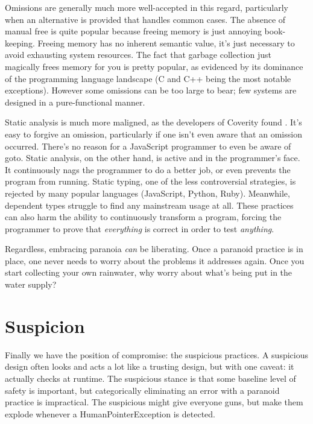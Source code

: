 Omissions are generally much more well-accepted in this regard, particularly
when an alternative is provided that handles common cases. The
absence of manual free is quite popular because freeing memory is just annoying
book-keeping. Freeing memory has no inherent semantic value, it's just necessary
to avoid exhausting system resources. The fact that garbage collection just
magically frees memory for you is pretty popular, as evidenced by its dominance
of the programming language landscape (C and C++ being the most notable exceptions).
However some omissions can be too large to bear; few systems are designed in
a pure-functional manner.

Static analysis is much more maligned, as the developers of Coverity found
\cite{bessey2010few}. It's easy to forgive an omission, particularly if one isn't
even aware that an omission occurred. There's no reason for a JavaScript programmer
to even be aware of goto.
Static analysis, on the other hand, is active and in the programmer's face.
It continuously nags the programmer to do a better job, or even prevents the
program from running. Static typing, one of the less controversial
strategies, is rejected by many popular languages (JavaScript, Python, Ruby).
Meanwhile, dependent types struggle to find any mainstream usage at all. These practices
can also harm the ability to continuously transform a program, forcing the
programmer to prove that \emph{everything} is correct in order to test \emph{anything}.

Regardless, embracing paranoia \emph{can} be liberating. Once a paranoid
practice is in place, one never needs to worry about the problems it addresses
again. Once you start collecting your own rainwater, why worry about what's being put
in the water supply?




\section{Suspicion}

Finally we have the position of compromise: the suspicious practices. A suspicious
design often looks and acts a lot like a trusting design, but with one caveat: it
actually checks at runtime. The suspicious stance is that some baseline level of
safety is important, but categorically eliminating an error with a paranoid practice
is impractical. The suspicious might give everyone guns, but make them explode whenever
a HumanPointerException is detected.

